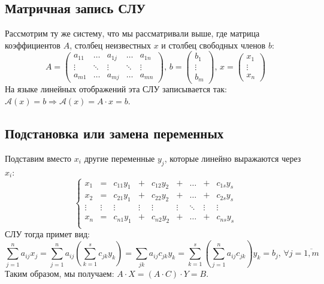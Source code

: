 \documentclass[12pt]{article}
\newcommand{\MA}{\mathcal{A}}
\theoremstyle{definition}
\newcommand{\ddsum}[2]{\displaystyle\sum\limits_{#1}^{#2}}
\begin{document}
\subsection*{Матричная запись СЛУ}
Рассмотрим ту же систему, что мы рассматривали выше, где матрица коэффициентов $A$, столбец неизвестных $x$ и столбец свободных членов $b$:
$$
	A = 
	\begin{pmatrix}
		a_{11} & \dotsc & a_{1j} & \dotsc & a_{1n}\\
		\vdots & \ddots & \vdots & \ddots & \vdots \\
		a_{m1} & \dotsc & a_{mj} & \dotsc & a_{mn}
	\end{pmatrix}, \, 
	b = 
	\begin{pmatrix}
		b_1 \\
		\vdots \\
		b_m
	\end{pmatrix}, \, 
	x = 
	\begin{pmatrix}
		x_1\\
		\vdots \\
		x_n
	\end{pmatrix}
$$ 
На языке линейных отображений эта СЛУ записывается так: $\MA(x) = b \Rightarrow \MA(x) = A{\cdot}x = b$. 
\subsection*{Подстановка или замена переменных}
Подставим вместо $x_i$ другие переменные $y_j$, которые линейно выражаются через $x_i$:
$$
	\left\{
		\begin{array}{ccccccccc}
			x_1 & = & c_{11}y_1 & + & c_{12}y_2 & + & \dotsc & + & c_{1s}y_s\\
			x_2 & = & c_{21}y_1 & + & c_{22}y_2 & + & \dotsc & + & c_{2s}y_s\\
			\vdots & \vdots & \vdots & \vdots & \vdots & \vdots & \ddots & \vdots & \vdots\\
			x_n & = & c_{n1}y_1 & + & c_{n2}y_2 & + & \dotsc & + & c_{ns}y_s\\
		\end{array}
	\right.
$$
СЛУ тогда примет вид:
$$
	\ddsum{j = 1}{n}a_{ij}x_j = \ddsum{j = 1}{n}a_{ij}\left(\ddsum{k = 1}{s} c_{jk}y_k\right) = \ddsum{jk}{}a_{ij}c_{jk}y_k = \ddsum{k = 1}{s}\left(\ddsum{j = 1}{n}a_{ij}c_{jk}\right)y_k = b_j, \, \forall j = \overline{1,m}
$$
Таким образом, мы получаем: $A{\cdot}X = (A{\cdot}C){\cdot}Y = B$.
\newpage
\end{document}
